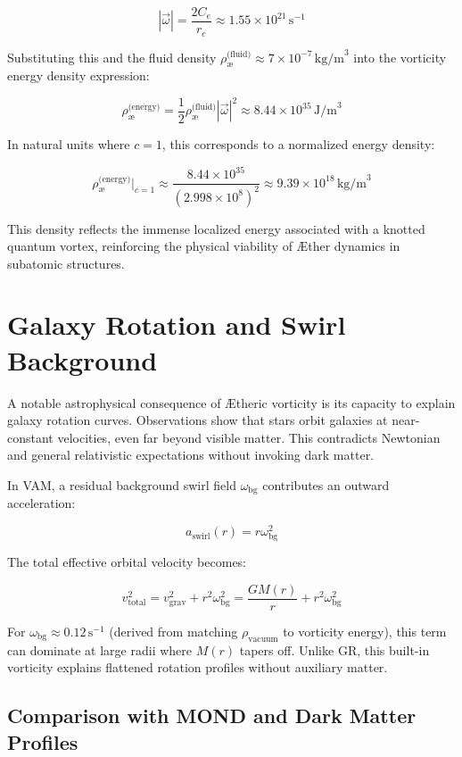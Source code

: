 \documentclass[12pt]{article}
\begin{document}
    \[
        |\vec{\omega}| = \frac{2 C_e}{r_c} \approx 1.55 \times 10^{21} \, \text{s}^{-1}
    \]

    Substituting this and the fluid density $\rho_{\text{\ae}}^{\text{(fluid)}} \approx 7 \times 10^{-7} \, \text{kg/m}^3$ into the vorticity energy density expression:

    \[
        \rho_{\text{\ae}}^{\text{(energy)}} = \frac{1}{2} \rho_{\text{\ae}}^{\text{(fluid)}} |\vec{\omega}|^2 \approx 8.44 \times 10^{35} \, \text{J/m}^3
    \]

    In natural units where $c = 1$, this corresponds to a normalized energy density:

    \[
        \rho_{\text{\ae}}^{\text{(energy)}} \Big|_{c=1} \approx \frac{8.44 \times 10^{35}}{(2.998 \times 10^8)^2} \approx 9.39 \times 10^{18} \, \text{kg/m}^3
    \]

    This density reflects the immense localized energy associated with a knotted quantum vortex, reinforcing the physical viability of \AE{}ther dynamics in subatomic structures.

    \section{Galaxy Rotation and Swirl Background}

    A notable astrophysical consequence of \AE{}theric vorticity is its capacity to explain galaxy rotation curves. Observations show that stars orbit galaxies at near-constant velocities, even far beyond visible matter. This contradicts Newtonian and general relativistic expectations without invoking dark matter.

    In VAM, a residual background swirl field $\omega_{\text{bg}}$ contributes an outward acceleration:

    \[
        a_{\text{swirl}}(r) = r \omega_{\text{bg}}^2
    \]

    The total effective orbital velocity becomes:

    \[
        v_{\text{total}}^2 = v_{\text{grav}}^2 + r^2 \omega_{\text{bg}}^2 = \frac{G M(r)}{r} + r^2 \omega_{\text{bg}}^2
    \]

    For $\omega_{\text{bg}} \approx 0.12 \, \text{s}^{-1}$ (derived from matching $\rho_{\text{vacuum}}$ to vorticity energy), this term can dominate at large radii where $M(r)$ tapers off. Unlike GR, this built-in vorticity explains flattened rotation profiles without auxiliary matter.

    \subsection{Comparison with MOND and Dark Matter Profiles}
\end{document}
